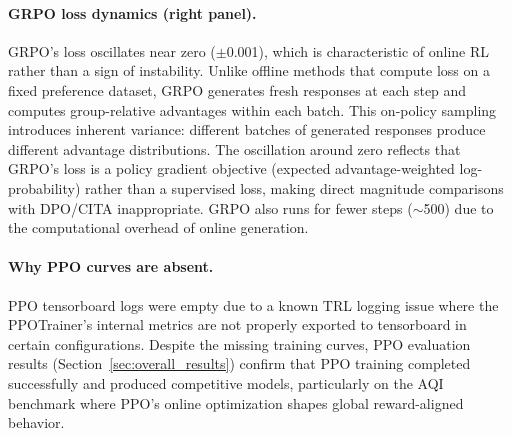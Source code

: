 \paragraph{GRPO loss dynamics (right panel).}
GRPO's loss oscillates near zero ($\pm$0.001), which is characteristic of online RL rather than a sign of instability.
Unlike offline methods that compute loss on a fixed preference dataset, GRPO generates fresh responses at each step and computes group-relative advantages within each batch.
This on-policy sampling introduces inherent variance: different batches of generated responses produce different advantage distributions.
The oscillation around zero reflects that GRPO's loss is a policy gradient objective (expected advantage-weighted log-probability) rather than a supervised loss, making direct magnitude comparisons with DPO/\textsc{CITA} inappropriate.
GRPO also runs for fewer steps ($\sim$500) due to the computational overhead of online generation.

\paragraph{Why PPO curves are absent.}
PPO tensorboard logs were empty due to a known TRL logging issue where the PPOTrainer's internal metrics are not properly exported to tensorboard in certain configurations.
Despite the missing training curves, PPO evaluation results (Section~\ref{sec:overall_results}) confirm that PPO training completed successfully and produced competitive models, particularly on the AQI benchmark where PPO's online optimization shapes global reward-aligned behavior.



